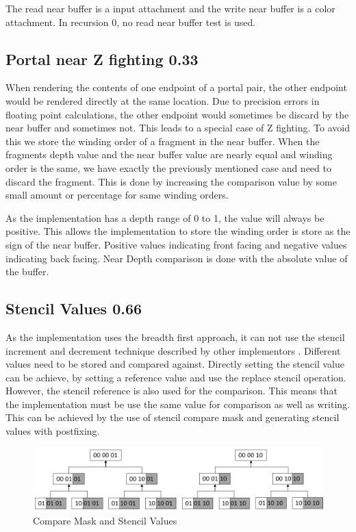 The read near buffer is a input attachment and the write near buffer is a color attachment. In recursion 0, no read near buffer test is used.

\subsection{Portal near Z fighting 0.33}
When rendering the contents of one endpoint of a portal pair, the other endpoint would be rendered directly at the same location. Due to precision errors in floating point calculations, the other endpoint would sometimes be discard by the near buffer and sometimes not. This leads to a special case of Z fighting. To avoid this we store the winding order of a fragment in the near buffer. When the fragments depth value and the near buffer value are nearly equal and winding order is the same, we have exactly the previously mentioned case and need to discard the fragment. This is done by increasing the comparison value by some small amount or percentage for same winding orders.

As the implementation has a depth range of 0 to 1, the value will always be positive. This allows the implementation to store the winding order is store as the sign of the near buffer. Positive values indicating front facing and negative values indicating back facing. Near Depth comparison is done with the absolute value of the buffer.

\subsection{Stencil Values 0.66}
As the implementation uses the breadth first approach, it can not use the stencil increment and decrement technique described by other implementors \cite{schmalstieg:1999:sewing, lowe:2003:fragment, lecture:portalProblems}. Different values need to be stored and compared against. Directly setting the stencil value can be achieve, by setting a reference value and use the replace stencil operation. However, the stencil reference is also used for the comparison. This means that the implementation must be use the same value for comparison as well as writing. This can be achieved by the use of stencil compare mask and generating stencil values with postfixing.

\begin{figure}[h]
	\includegraphics[width=\linewidth]{images/stencilvalues2.png}
	\caption{Compare Mask and Stencil Values}
	\label{fig:stencilvalues}
\end{figure}


